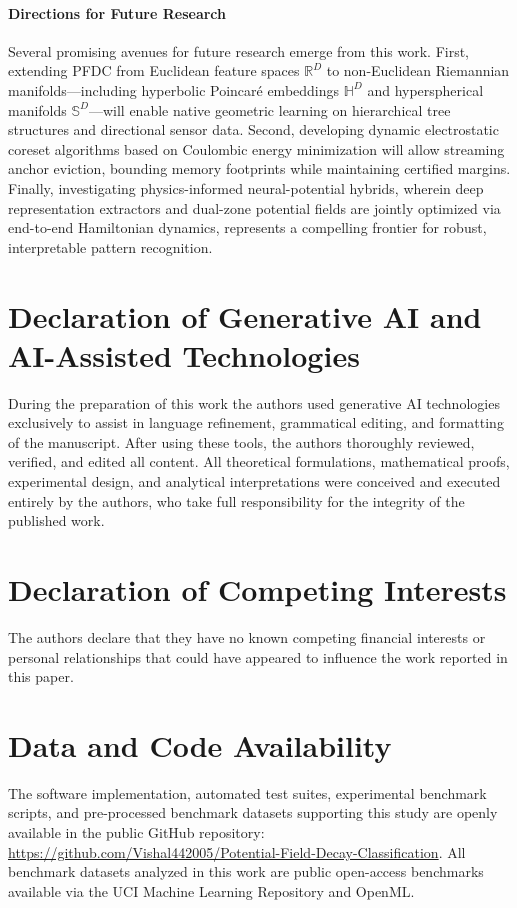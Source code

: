 \documentclass[times, review, 10pt]{elsarticle}
\begin{document}
\paragraph{Directions for Future Research}
Several promising avenues for future research emerge from this work. First, extending PFDC from Euclidean feature spaces $\mathbb{R}^D$ to non-Euclidean Riemannian manifolds---including hyperbolic Poincaré embeddings $\mathbb{H}^D$ and hyperspherical manifolds $\mathbb{S}^D$---will enable native geometric learning on hierarchical tree structures and directional sensor data. Second, developing dynamic electrostatic coreset algorithms based on Coulombic energy minimization will allow streaming anchor eviction, bounding memory footprints while maintaining certified margins. Finally, investigating physics-informed neural-potential hybrids, wherein deep representation extractors and dual-zone potential fields are jointly optimized via end-to-end Hamiltonian dynamics, represents a compelling frontier for robust, interpretable pattern recognition.

\section*{Declaration of Generative AI and AI-Assisted Technologies}
During the preparation of this work the authors used generative AI technologies exclusively to assist in language refinement, grammatical editing, and formatting of the manuscript. After using these tools, the authors thoroughly reviewed, verified, and edited all content. All theoretical formulations, mathematical proofs, experimental design, and analytical interpretations were conceived and executed entirely by the authors, who take full responsibility for the integrity of the published work.

\section*{Declaration of Competing Interests}
The authors declare that they have no known competing financial interests or personal relationships that could have appeared to influence the work reported in this paper.

\section*{Data and Code Availability}
The software implementation, automated test suites, experimental benchmark scripts, and pre-processed benchmark datasets supporting this study are openly available in the public GitHub repository: \url{https://github.com/Vishal442005/Potential-Field-Decay-Classification}. All benchmark datasets analyzed in this work are public open-access benchmarks available via the UCI Machine Learning Repository and OpenML.

\begingroup
\footnotesize


\endgroup
\end{document}
